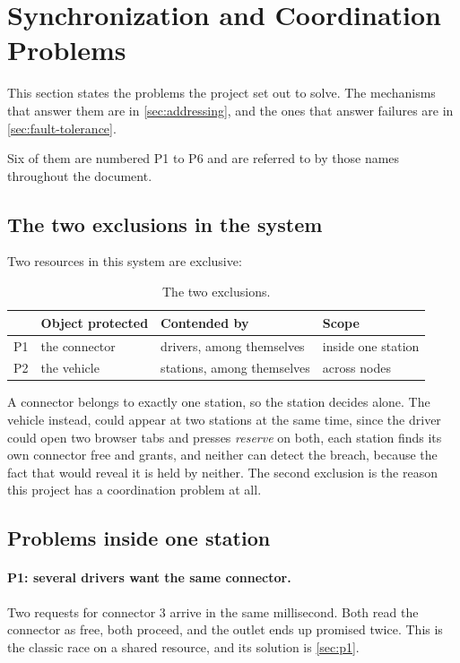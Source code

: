 \section{Synchronization and Coordination Problems}
\label{sec:problems}

This section states the problems the project set out to solve. The mechanisms that answer
them are in \cref{sec:addressing}, and the ones that answer failures are in
\cref{sec:fault-tolerance}.

Six of them are numbered P1 to P6 and are referred to by those names throughout the
document.

\subsection{The two exclusions in the system}
\label{sec:two-exclusions}

Two resources in this system are exclusive:

\begin{table}[h]
\centering\small
\caption{The two exclusions.}
\label{tab:exclusions}
\begin{tabularx}{\textwidth}{@{}l >{\raggedright\arraybackslash}p{3.2cm}
                               >{\raggedright\arraybackslash}p{4.2cm} X@{}}
\toprule
& Object protected & Contended by & Scope \\
\midrule
P1 & the connector & drivers, among themselves & inside one station \\
P2 & the vehicle & stations, among themselves & across nodes \\
\bottomrule
\end{tabularx}
\end{table}

A connector belongs to exactly one station, so the station decides alone. The vehicle instead, could appear at two stations at the same time, since the driver could open two browser
tabs and presses \emph{reserve} on both, each station finds its own connector free and
grants, and neither can detect the breach, because the fact that would reveal it is held by
neither. The second exclusion is the reason this project has a coordination
problem at all.

\subsection{Problems inside one station}
\label{sec:local-problems}

\paragraph{P1: several drivers want the same connector.} Two requests for connector 3 arrive
in the same millisecond. Both read the connector as free, both proceed, and the outlet ends
up promised twice. This is the classic race on a shared resource, and its solution is
\cref{sec:p1}.

